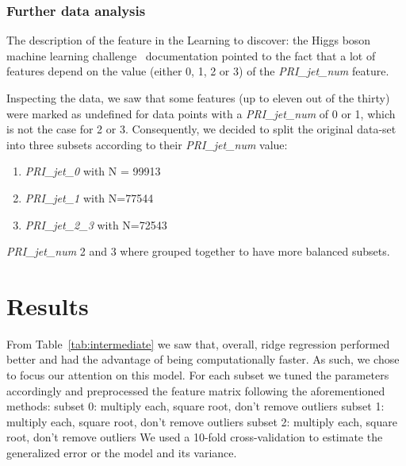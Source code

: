 \documentclass[10pt,conference,compsocconf]{IEEEtran}
\begin{document}
\subsubsection{Further data analysis}
The description of the feature in the Learning to discover: the Higgs
boson machine learning challenge~\cite{higgsMLdoc} documentation pointed 
to the fact that a lot of features depend on the value (either 0, 1, 2 or 3)
of the \textit{PRI\_jet\_num} feature.

Inspecting the data, we saw that some features (up to eleven out of the thirty) 
were marked as undefined for data points with a \textit{PRI\_jet\_num} of 0 or 1, 
which is not the case for 2 or 3. Consequently, we decided to split the 
original data-set into three subsets according to their \textit{PRI\_jet\_num} value: 
\begin{enumerate}
    \item \textit{PRI\_jet\_0} with N = 99913
    \item \textit{PRI\_jet\_1} with N=77544
    \item \textit{PRI\_jet\_2\_3} with N=72543
\end{enumerate}
\textit{PRI\_jet\_num} 2 and 3 where grouped together to have more 
balanced subsets.

\section{Results}
From Table~\ref{tab:intermediate} we saw that, overall, ridge regression
performed better and had the advantage of being computationally faster.
As such, we chose to focus our attention on this model. For each subset we
tuned the parameters accordingly and preprocessed the feature matrix 
following the aforementioned methods: 
subset 0: multiply each, square root, don't remove outliers
subset 1: multiply each, square root, don't remove outliers
subset 2: multiply each, square root, don't remove outliers
We used a 10-fold cross-validation to estimate the generalized error or the 
model and its variance.
\end{document}
